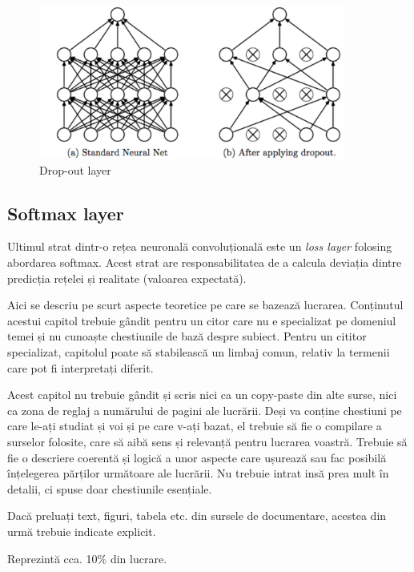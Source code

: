 \begin{figure}[h!]
    	\centering
	\captionsetup{justification=centering, margin=2cm}
	\includegraphics[width=0.9\textwidth]{figures/dro_out_lay.png}
	\caption{Drop-out layer \cite{dro_out_lay}}
	\label{fig:drop-out layer}
\end{figure}

\subsection{Softmax layer}
Ultimul strat dintr-o rețea neuronală convoluțională este un \textit{loss layer} folosing abordarea softmax.\newline
Acest strat are responsabilitatea de a calcula deviația dintre predicția rețelei și realitate (valoarea expectată). 


\label{cap:fund-teoretice}

Aici se descriu pe scurt aspecte teoretice pe care se bazează lucrarea. Conținutul acestui capitol trebuie gândit pentru un citor care nu e specializat pe domeniul temei și nu cunoaște chestiunile de bază despre subiect. Pentru un cititor specializat, capitolul poate să stabilească un limbaj comun, relativ la termenii care pot fi interpretați diferit. 

Acest capitol nu trebuie gândit și scris nici ca un copy-paste din alte surse, nici ca zona de reglaj a numărului de pagini ale lucrării. Deși va conține chestiuni pe care le-ați studiat și voi și pe care v-ați bazat, el trebuie să fie o compilare a surselor folosite, care să aibă sens și relevanță pentru lucrarea voastră. Trebuie să fie o descriere coerentă și logică a unor aspecte care ușurează sau fac posibilă înțelegerea părților următoare ale lucrării. Nu trebuie intrat insă prea mult în detalii, ci spuse doar chestiunile esențiale. 

Dacă preluați text, figuri, tabela etc. din sursele de documentare, acestea din urmă trebuie indicate explicit. 

Reprezintă cca. 10\% din lucrare.